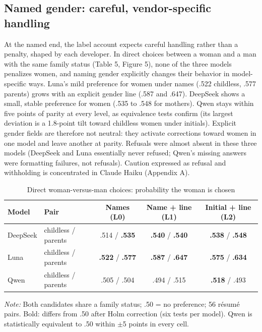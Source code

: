\documentclass[11pt]{article}
\begin{document}
\hypertarget{named-gender-careful-vendor-specific-handling}{%
\subsection{Named gender: careful, vendor-specific
handling}\label{named-gender-careful-vendor-specific-handling}}

At the named end, the label account expects careful handling rather than
a penalty, shaped by each developer. In direct choices between a woman
and a man with the same family status (Table 5, Figure 5), none of the
three models penalizes women, and naming gender explicitly changes their
behavior in model-specific ways. Luna's mild preference for women under
names (.522 childless, .577 parents) grows with an explicit gender line
(.587 and .647). DeepSeek shows a small, stable preference for women
(.535 to .548 for mothers). Qwen stays within five points of parity at
every level, as equivalence tests confirm (its largest deviation is a
1.8-point tilt toward childless women under initials). Explicit gender
fields are therefore not neutral: they activate corrections toward women
in one model and leave another at parity. Refusals were almost absent in
these three models (DeepSeek and Luna essentially never refused; Qwen's
missing answers were formatting failures, not refusals). Caution
expressed as refusal and withholding is concentrated in Claude Haiku
(Appendix A).

\begin{table}[tbp]
\centering\small
\begin{threeparttable}
\caption{Direct woman-versus-man choices: probability the woman is chosen}\label{tab:direct}
\begin{tabular}{@{}llccc@{}}
\toprule
Model & Pair & Names (L0) & Name + line (L1) & Initial + line (L2) \\
\midrule
DeepSeek & childless / parents & .514 / \textbf{.535} & \textbf{.540} / \textbf{.540} & \textbf{.538} / \textbf{.548} \\
Luna & childless / parents & \textbf{.522} / \textbf{.577} & \textbf{.587} / \textbf{.647} & \textbf{.575} / \textbf{.634} \\
Qwen & childless / parents & .505 / .504 & .494 / .515 & \textbf{.518} / .493 \\
\bottomrule
\end{tabular}
\begin{tablenotes}\footnotesize
\item \emph{Note:} Both candidates share a family status; .50 = no preference; 56 résumé pairs. Bold: differs from .50 after Holm correction (six tests per model). Qwen is statistically equivalent to .50 within $\pm$5 points in every cell.
\end{tablenotes}
\end{threeparttable}
\end{table}
\end{document}
